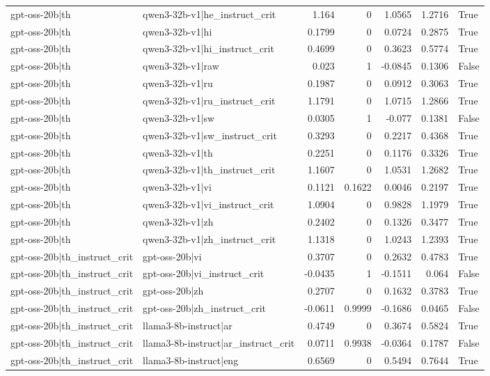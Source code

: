 \begin{table}
\begin{tabular}{l l r r r r l}
gpt-oss-20b|th & qwen3-32b-v1|he_instruct_crit & 1.164 & 0 & 1.0565 & 1.2716 & True \\
gpt-oss-20b|th & qwen3-32b-v1|hi & 0.1799 & 0 & 0.0724 & 0.2875 & True \\
gpt-oss-20b|th & qwen3-32b-v1|hi_instruct_crit & 0.4699 & 0 & 0.3623 & 0.5774 & True \\
gpt-oss-20b|th & qwen3-32b-v1|raw & 0.023 & 1 & -0.0845 & 0.1306 & False \\
gpt-oss-20b|th & qwen3-32b-v1|ru & 0.1987 & 0 & 0.0912 & 0.3063 & True \\
gpt-oss-20b|th & qwen3-32b-v1|ru_instruct_crit & 1.1791 & 0 & 1.0715 & 1.2866 & True \\
gpt-oss-20b|th & qwen3-32b-v1|sw & 0.0305 & 1 & -0.077 & 0.1381 & False \\
gpt-oss-20b|th & qwen3-32b-v1|sw_instruct_crit & 0.3293 & 0 & 0.2217 & 0.4368 & True \\
gpt-oss-20b|th & qwen3-32b-v1|th & 0.2251 & 0 & 0.1176 & 0.3326 & True \\
gpt-oss-20b|th & qwen3-32b-v1|th_instruct_crit & 1.1607 & 0 & 1.0531 & 1.2682 & True \\
gpt-oss-20b|th & qwen3-32b-v1|vi & 0.1121 & 0.1622 & 0.0046 & 0.2197 & True \\
gpt-oss-20b|th & qwen3-32b-v1|vi_instruct_crit & 1.0904 & 0 & 0.9828 & 1.1979 & True \\
gpt-oss-20b|th & qwen3-32b-v1|zh & 0.2402 & 0 & 0.1326 & 0.3477 & True \\
gpt-oss-20b|th & qwen3-32b-v1|zh_instruct_crit & 1.1318 & 0 & 1.0243 & 1.2393 & True \\
gpt-oss-20b|th_instruct_crit & gpt-oss-20b|vi & 0.3707 & 0 & 0.2632 & 0.4783 & True \\
gpt-oss-20b|th_instruct_crit & gpt-oss-20b|vi_instruct_crit & -0.0435 & 1 & -0.1511 & 0.064 & False \\
gpt-oss-20b|th_instruct_crit & gpt-oss-20b|zh & 0.2707 & 0 & 0.1632 & 0.3783 & True \\
gpt-oss-20b|th_instruct_crit & gpt-oss-20b|zh_instruct_crit & -0.0611 & 0.9999 & -0.1686 & 0.0465 & False \\
gpt-oss-20b|th_instruct_crit & llama3-8b-instruct|ar & 0.4749 & 0 & 0.3674 & 0.5824 & True \\
gpt-oss-20b|th_instruct_crit & llama3-8b-instruct|ar_instruct_crit & 0.0711 & 0.9938 & -0.0364 & 0.1787 & False \\
gpt-oss-20b|th_instruct_crit & llama3-8b-instruct|eng & 0.6569 & 0 & 0.5494 & 0.7644 & True \\

\end{tabular}
\end{table}
